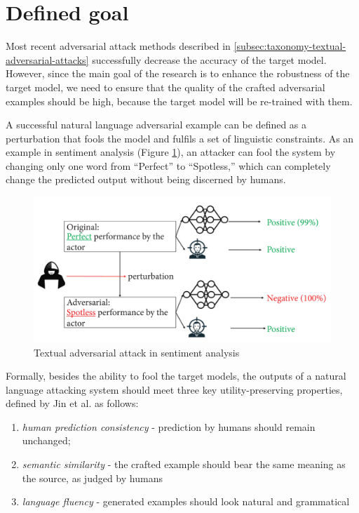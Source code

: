 \section{Defined goal}\label{sec:defined-goal}

Most recent adversarial attack methods described in \ref{subsec:taxonomy-textual-adversarial-attacks} successfully decrease the accuracy of the target model.
However, since the main goal of the research is to enhance the robustness of the target model, we need to ensure that the quality of the crafted adversarial examples should be high, because the target model will be re-trained with them.

A successful natural language adversarial example can be defined as a perturbation that fools the model and fulfils  a set of linguistic constraints.
As an example in sentiment analysis (Figure \ref{fig:3_adverarial_example}), an attacker can fool the system by changing only one word from “Perfect” to “Spotless,” which can completely change the predicted output without being discerned by humans.

\begin{figure}[h]
    \centering
    \includegraphics[width=0.7\linewidth]{images/3_adversarial_attack.png}
    \caption{Textual adversarial attack in sentiment analysis \cite{10.1155/2022/6458488}}
    \label{fig:3_adverarial_example}
\end{figure}

Formally, besides the ability to fool the target models, the outputs of a natural language attacking system should meet three key utility-preserving properties, defined by Jin et al. \cite{journals/corr/abs-1907-11932} as follows:
\begin{enumerate}
    \item \emph{human prediction consistency} - prediction by humans should remain unchanged;
    \item \emph{semantic similarity} -  the crafted example should bear the same meaning as the source, as judged by humans
    \item \emph{language fluency} - generated examples should look natural and grammatical
\end{enumerate}




